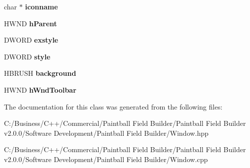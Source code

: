 \begin{DoxyCompactItemize}
\item 
\hypertarget{class_c_c_t_window_a2ccc9f0a7629c04a6632b5398cf3f31a}{
char $\ast$ {\bfseries iconname}}
\label{class_c_c_t_window_a2ccc9f0a7629c04a6632b5398cf3f31a}

\item 
\hypertarget{class_c_c_t_window_a64567ca14d081a1384171aa7a4893b21}{
HWND {\bfseries hParent}}
\label{class_c_c_t_window_a64567ca14d081a1384171aa7a4893b21}

\item 
\hypertarget{class_c_c_t_window_a87f6bfb514c836de606118828f667427}{
DWORD {\bfseries exstyle}}
\label{class_c_c_t_window_a87f6bfb514c836de606118828f667427}

\item 
\hypertarget{class_c_c_t_window_a62591dcaf2c98cafc9b7e41e9967e4b8}{
DWORD {\bfseries style}}
\label{class_c_c_t_window_a62591dcaf2c98cafc9b7e41e9967e4b8}

\item 
\hypertarget{class_c_c_t_window_ab4f6cb2f0c2d258847fe0eb7ddb0cc42}{
HBRUSH {\bfseries background}}
\label{class_c_c_t_window_ab4f6cb2f0c2d258847fe0eb7ddb0cc42}

\item 
\hypertarget{class_c_c_t_window_aa89dae0317ff21524e482a64bcd54731}{
HWND {\bfseries hWndToolbar}}
\label{class_c_c_t_window_aa89dae0317ff21524e482a64bcd54731}

\end{DoxyCompactItemize}


The documentation for this class was generated from the following files:\begin{DoxyCompactItemize}
\item 
C:/Business/C++/Commercial/Paintball Field Builder/Paintball Field Builder v2.0.0/Software Development/Paintball Field Builder/Window.hpp\item 
C:/Business/C++/Commercial/Paintball Field Builder/Paintball Field Builder v2.0.0/Software Development/Paintball Field Builder/Window.cpp\end{DoxyCompactItemize}
